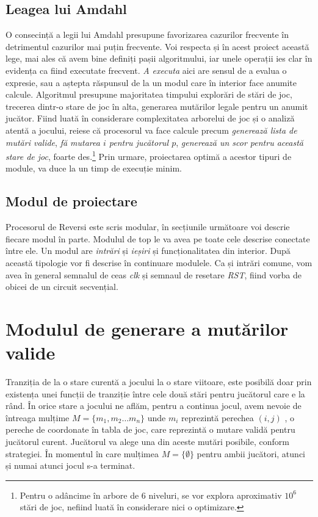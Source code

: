 \documentclass[12pt,twoside,a4paper,fleqn]{book}
\theoremstyle{definition}
\begin{document}
\subsection{Leagea lui Amdahl}\label{amdahl}
O consecință a legii lui Amdahl presupune favorizarea cazurilor frecvente în detrimentul cazurilor mai puțin frecvente. Voi respecta și în acest proiect această lege, mai ales că avem bine definiți pașii algoritmului, iar unele operații ies clar în evidența ca fiind executate frecvent. \emph{A executa} aici are sensul de a evalua o expresie, sau a aștepta răspunsul de la un modul care în interior face anumite calcule. Algoritmul presupune majoritatea timpului explorări de stări de joc, trecerea dintr-o stare de joc în alta, generarea mutărilor legale pentru un anumit jucător. Fiind luată în considerare complexitatea arborelui de joc și o analiză atentă a jocului, reiese că procesorul va face calcule precum \emph{generează lista de mutări valide}, \emph{fă mutarea $i$ pentru jucătorul $p$}, \emph{generează un scor pentru această stare de joc}, foarte des.\footnote{Pentru o adâncime în arbore de 6 niveluri, se vor explora aproximativ $10^{6}$ stări de joc, nefiind luată în considerare nici o optimizare.} Prin urmare, proiectarea optimă a acestor tipuri de module, va duce la un timp de execuție minim.
\subsection{Modul de proiectare}
Procesorul de Reversi este scris modular, în secțiunile următoare voi descrie fiecare modul în parte. Modulul de top le va avea pe toate cele descrise conectate între ele. Un modul are \emph{intrări} și \emph{ieșiri} și funcționalitatea din interior. După această tipologie vor fi descrise în continuare modulele. Ca și intrări comune, vom avea în general semnalul de ceas \emph{clk} și semnaul de resetare \emph{RST}, fiind vorba de obicei de un circuit secvențial.
\section{Modulul de generare a mutărilor valide}
\label{modul_moves_map}
Tranziția de la o stare curentă a jocului la o stare viitoare, este posibilă doar prin existența unei funcții de tranziție între cele două stări pentru jucătorul care e la rând. În orice stare a jocului ne aflăm, pentru a continua jocul, avem nevoie de întreaga mulțime $M = \lbrace m_{1}, m_{2} \ldots m_{n}\rbrace $ unde $m_{i}$ reprezintă perechea $(i,j)$ , o pereche de coordonate în tabla de joc, care reprezintă o mutare validă pentru jucătorul curent. Jucătorul va alege una din aceste mutări posibile, conform strategiei. În momentul în care mulțimea $M = \{\emptyset\}$ pentru ambii jucători, atunci și numai atunci jocul s-a terminat.
\end{document}
